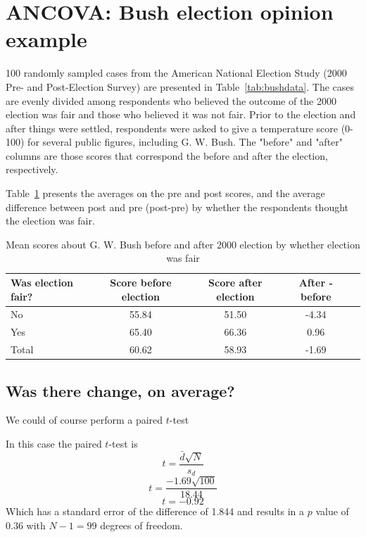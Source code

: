 \section{ANCOVA: Bush election opinion example}

100 randomly sampled cases from the American National Election Study (2000 Pre- and Post-Election Survey) are presented in Table~\ref{tab:bushdata}. The cases are evenly divided among respondents who believed the outcome of the 2000 election was fair and those who believed it was not fair. Prior to the election and after things were settled, respondents were asked to give a temperature score (0-100) for several public figures, including G. W. Bush. The "before" and "after" columns are those scores that correspond the before and after the election, respectively.

Table~\ref{tab:bushmeans} presents the averages on the pre and post scores, and the average difference between post and pre (post-pre) by whether the respondents thought the election was fair.

\begin{table}[htbp]\centering
\caption{ Mean scores about G. W. Bush before and after 2000 election by whether election was fair
\label{tab:bushmeans}}
\begin{tabular}{lcccc}
\hline
Was election fair? & Score before election & Score after election & After - before \\
\hline
No &   55.84 &   51.50 &   -4.34 \\
Yes &   65.40 &   66.36 &    0.96 \\
\hline
  Total &   60.62 &   58.93 &   -1.69 \\
\hline
\end{tabular}
\end{table}

\subsection{Was there change, on average?}

We could of course perform a paired $t$-test

In this case the paired $t$-test is
\begin{equation}
t=\frac{\bar{d}\sqrt{N}}{s_{d}}
\end{equation}
\begin{equation}
t=\frac{-1.69\sqrt{100}}{18.44}
\end{equation}
\begin{equation}
t=-0.92
\end{equation}
Which has a standard error of the difference of 1.844 and results in a $p$ value of 0.36 with $N-1=99$ degrees of freedom.

